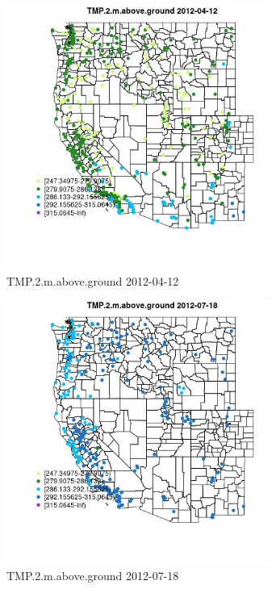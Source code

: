 \begin{figure} 
\centering  
\includegraphics[width=0.77\textwidth]{Code_Outputs/Report_ML_input_PM25_Step4_part_e_de_duplicated_aves_compiled_2019-05-14wNAs_MapObsTMP2maboveground2012-04-12.jpg} 
\caption{\label{fig:Report_ML_input_PM25_Step4_part_e_de_duplicated_aves_compiled_2019-05-14wNAsMapObsTMP2maboveground2012-04-12}TMP.2.m.above.ground 2012-04-12} 
\end{figure} 
 

\begin{figure} 
\centering  
\includegraphics[width=0.77\textwidth]{Code_Outputs/Report_ML_input_PM25_Step4_part_e_de_duplicated_aves_compiled_2019-05-14wNAs_MapObsTMP2maboveground2012-07-18.jpg} 
\caption{\label{fig:Report_ML_input_PM25_Step4_part_e_de_duplicated_aves_compiled_2019-05-14wNAsMapObsTMP2maboveground2012-07-18}TMP.2.m.above.ground 2012-07-18} 
\end{figure} 
 

